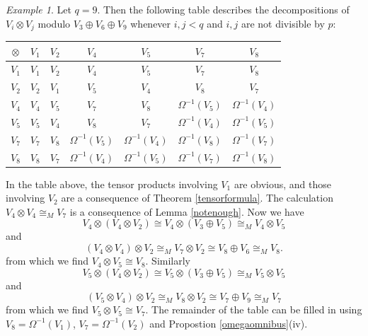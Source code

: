 \documentclass[a4paper]{amsart}
\theoremstyle{definition}
\theoremstyle{remark}
\newtheorem{eg}[Lemma]{Example}
\theoremstyle{Acknowledgments}
\begin{document}
\begin{eg} Let $q=9$. Then the following table describes the decompositions of $V_i \otimes V_j$ modulo $V_3 \oplus V_6 \oplus V_9$ whenever $i,j<q$ and $i,j$ are not divisible by $p$:

\vspace{1cm}
\begin{center}
\begin{tabular}{c|cccccc}
 $\otimes$ & $V_1$ & $V_2$ & $V_4$ & $V_5$ & $V_7$ & $V_8$\\
\hline
$V_1$ & $V_1$ & $V_2$ & $V_4$ & $V_5$ & $V_7$ & $V_8$\\
$V_2$ & $V_2$ & $V_1$ & $V_5$ & $V_4$ & $V_8$ & $V_7$\\
$V_4$ & $V_4$ & $V_5$ & $V_7$ & $V_8$ & $\Omega^{-1}(V_5)$ & $\Omega^{-1}(V_4)$\\
$V_5$ & $V_5$ & $V_4$ & $V_8$ & $V_7$ & $\Omega^{-1}(V_4)$ & $\Omega^{-1}(V_5)$\\
$V_7$ & $V_7$ & $V_8$ & $\Omega^{-1}(V_5)$ & $\Omega^{-1}(V_4)$ & $\Omega^{-1}(V_8)$ & $\Omega^{-1}(V_7)$\\
$V_8$ & $V_8$ & $V_7$ & $\Omega^{-1}(V_4)$ & $\Omega^{-1}(V_5)$ & $\Omega^{-1}(V_7)$ & $\Omega^{-1}(V_8)$\\

\end{tabular}
\end{center}
\vspace{1cm}
In the table above, the tensor products involving $V_1$ are obvious, and those involving $V_2$ are a consequence of Theorem \ref{tensorformula}. The calculation $V_4 \otimes V_4 \cong_M V_7$ is a consequence of Lemma \ref{notenough}. Now we have
\[V_4 \otimes (V_4 \otimes V_2) \cong V_4 \otimes (V_3 \oplus V_5) \cong_M V_4 \otimes V_5\]
and
\[(V_4 \otimes V_4) \otimes V_2 \cong_M V_7 \otimes V_2 \cong V_8 \oplus V_6 \cong_M V_8.\]
from which we find $V_4 \otimes V_5 \cong V_8$. Similarly
\[V_5 \otimes (V_4 \otimes V_2) \cong V_5 \otimes (V_3 \oplus V_5) \cong_M V_5 \otimes V_5 \]
and
\[(V_5 \otimes V_4) \otimes V_2 \cong_M V_8 \otimes V_2 \cong V_7 \oplus V_9 \cong_M V_7\]
from which we find $V_5 \otimes V_5 \cong V_7$. The remainder of the table can be filled in using $V_8= \Omega^{-1}(V_1)$, $V_7 = \Omega^{-1}(V_2)$ and Propostion \ref{omegaomnibus}(iv).

\end{eg}





\end{document}
